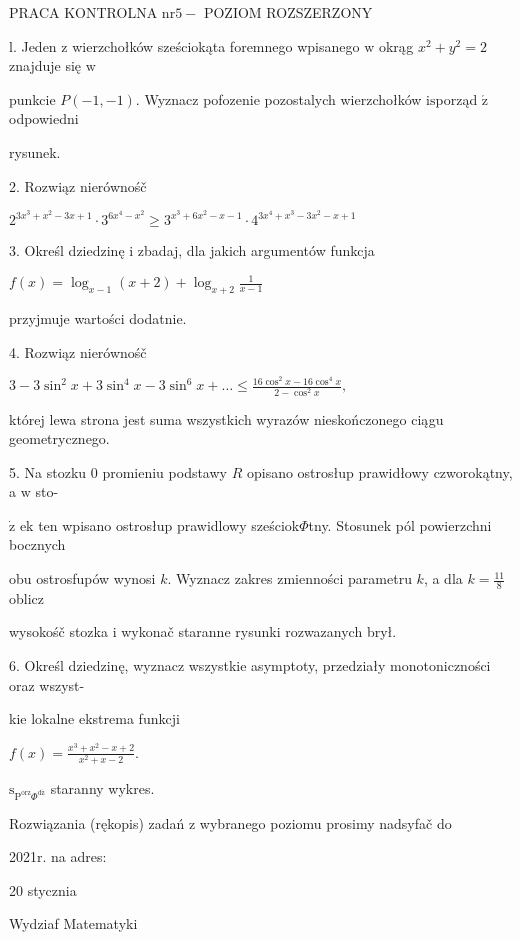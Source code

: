 \documentclass[a4paper,12pt]{article}
\begin{document}
PRACA KONTROLNA $\mathrm{n}\mathrm{r} 5-$ POZIOM ROZSZERZONY

l. Jeden $\mathrm{z}$ wierzchołków sześciokąta foremnego wpisanego $\mathrm{w}$ okrąg $x^{2}+y^{2}=2$ znajduje się $\mathrm{w}$

punkcie $P(-1,-1)$. Wyznacz pofozenie pozostalych wierzchołków $\mathrm{i}\mathrm{s}$porząd $\acute{\mathrm{z}}$ odpowiedni

rysunek.

2. Rozwiąz nierównośč

$2^{3x^{3}+x^{2}-3x+1}\cdot 3^{6x^{4}-x^{2}}\geq 3^{x^{3}+6x^{2}-x-1}\cdot 4^{3x^{4}+x^{3}-3x^{2}-x+1}$

3. Określ dziedzinę $\mathrm{i}$ zbadaj, dla jakich argumentów funkcja

$f(x)=\displaystyle \log_{x-1}(x+2)+\log_{x+2}\frac{1}{x-1}$

przyjmuje wartości dodatnie.

4. Rozwiąz nierównośč

$3-3\displaystyle \sin^{2}x+3\sin^{4}x-3\sin^{6}x+\ldots\leq\frac{16\cos^{2}x-16\cos^{4}x}{2-\cos^{2}x},$

której lewa strona jest suma wszystkich wyrazów nieskończonego ciągu geometrycznego.

5. Na stozku $0$ promieniu podstawy $R$ opisano ostrosłup prawidłowy czworokątny, a $\mathrm{w}$ sto-

$\dot{\mathrm{z}}$ ek ten wpisano ostrosłup prawidlowy sześciok$\Phi$tny. Stosunek pól powierzchni bocznych

obu ostrosfupów wynosi $k$. Wyznacz zakres zmienności parametru $k$, a dla $k=\displaystyle \frac{11}{8}$ oblicz

wysokośč stozka $\mathrm{i}$ wykonač staranne rysunki rozwazanych brył.

6. Określ dziedzinę, wyznacz wszystkie asymptoty, przedziały monotoniczności oraz wszyst-

kie lokalne ekstrema funkcji

$f(x)=\displaystyle \frac{x^{3}+x^{2}-x+2}{x^{2}+x-2}.$

$\mathrm{s}_{\mathrm{P}^{\mathrm{o}\mathrm{r}\mathrm{z}}\Phi^{\mathrm{d}\acute{\mathrm{z}}}}$ staranny wykres.

Rozwiązania (rękopis) zadań z wybranego poziomu prosimy nadsyfač do

2021r. na adres:

20 stycznia

Wydziaf Matematyki
\end{document}
